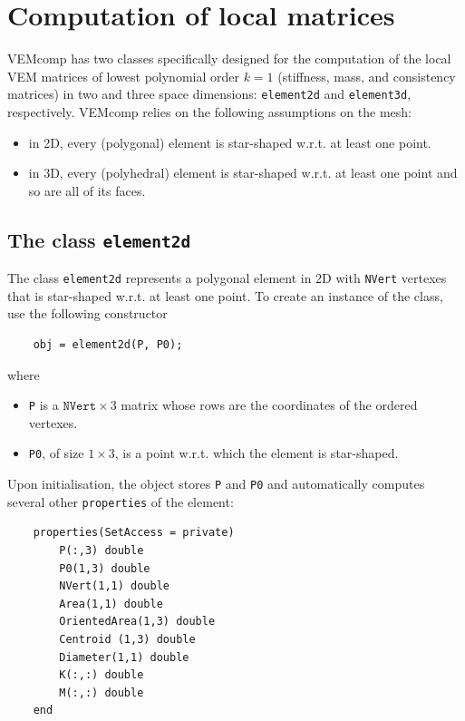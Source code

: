 \documentclass[a4paper]{article}
\begin{document}
\section{Computation of local matrices}
\label{sec:computation_local_matrices}
VEMcomp has two classes specifically designed for the computation of the local VEM matrices of lowest polynomial order $k=1$ (stiffness, mass, and consistency matrices) in two and three space dimensions: \texttt{element2d} and \texttt{element3d}, respectively.  VEMcomp relies on the following assumptions on the mesh:
\begin{itemize}
\item in 2D, every (polygonal) element is star-shaped w.r.t. at least one point.
\item in 3D, every (polyhedral) element is star-shaped w.r.t. at least one point and so are all of its faces.
\end{itemize}

\subsection{The class \texttt{element2d}}
The class \texttt{element2d} represents a polygonal element in 2D with \texttt{NVert} vertexes that is star-shaped w.r.t. at least one point. To create an instance of the class, use the following constructor

\begin{lstlisting}
	obj = element2d(P, P0);
\end{lstlisting}
%
where
\begin{itemize}
\item \texttt{P} is a $\texttt{NVert} \times 3$ matrix whose rows are the coordinates of the ordered vertexes. 
\item \texttt{P0}, of size $1\times 3$, is a point w.r.t. which the element is star-shaped.
\end{itemize}

\noindent
Upon initialisation, the object stores \texttt{P} and \texttt{P0} and automatically computes several other \texttt{properties} of the element:

\begin{lstlisting}
	properties(SetAccess = private)
		P(:,3) double
		P0(1,3) double 
		NVert(1,1) double
		Area(1,1) double 
		OrientedArea(1,3) double
		Centroid (1,3) double
		Diameter(1,1) double
		K(:,:) double
		M(:,:) double
	end
\end{lstlisting}
\end{document}
